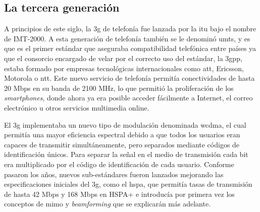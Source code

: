 \subsection{La tercera generación}
\par A principios de este siglo, la \gls{3g} de telefonía fue lanzada por la \gls{itu} bajo el nombre de IMT-2000. A esta generación de telefonía también se le denominó \gls{umts}, y es que es el primer estándar que aseguraba compatibilidad telefónica entre países ya que el consorcio encargado de velar por el correcto uso del estándar, la \gls{3gpp}, estaba formado por empresas tecnológicas internacionales como \gls{att}, Ericsson, Motorola o \gls{ntt}. Este nuevo servicio de telefonía permitía conectividades de hasta 20 Mbps en su banda de 2100 MHz, lo que permitió la proliferación de los \textit{smartphones}, donde ahora ya era posible acceder fácilmente a Internet, el correo electrónico u otros servicios multimedia online. \cite{LaCuevaGSM2014, Wikipedia2019} 
\\
\par El \gls{3g} implementaba un nuevo tipo de modulación denominada \gls{wcdma}, el cual permitía una mayor eficiencia espectral debido a que todos los usuarios eran capaces de transmitir simultáneamente, pero separados mediante códigos de identificación únicos. Para separar la señal en el medio de transmisión cada bit era multiplicado por el código de identificación de cada usuario. Conforme pasaron los años, nuevos sub-estándares fueron lanzados mejorando las especificaciones iniciales del \gls{3g}, como el \gls{hspa}, que permitía tasas de transmisión de hasta 42 Mbps y 168 Mbps en HSPA+ e introducía por primera vez los conceptos de \gls{mimo} y \textit{beamforming} que se explicarán más adelante.


